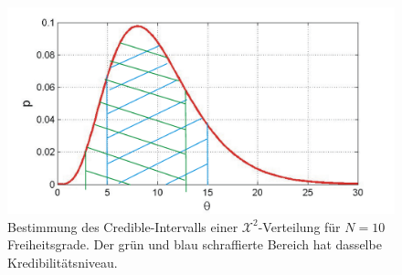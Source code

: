 \begin{figure}[!htb]
	\begin{center}
		\includegraphics[width=120mm]
		{08_vorlesung/media/Posterior_Vertrauensintervall_Chi2_all.png}
		\caption{
			Bestimmung des Credible-Intervalls einer $\mathcal{X}^2$-Verteilung für 
		$N=10$ Freiheitsgrade. Der grün und blau schraffierte Bereich hat 
	dasselbe Kredibilitätsniveau.}
     \label{fig:Beispiel_Bestimmung_CredibleIntervall_nichtsymmetrisch} 
	\end{center}
\end{figure}
